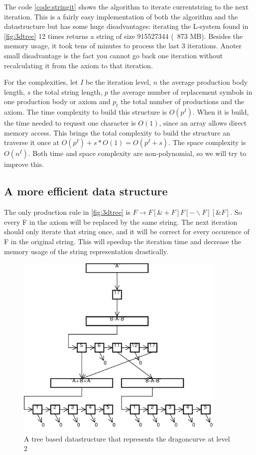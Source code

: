 \documentclass[11pt,a4paper]{article}
\begin{document}
The code \ref{code:stringit} shows the algorithm to iterate currentstring to the next iteration. This is a fairly easy implementation of both the algorithm and the datastructure but has some huge disadvantages: iterating the L-system found in \ref{fig:3dtree} 12 times returns a string of size 915527344 (~873 MB). Besides the memory usage, it took tens of minutes to process the last 3 iterations. Anoter small disadvantage is the fact you cannot go back one iteration without recalculating it from the axiom to that iteration.

For the complexities, let $I$ be the iteration level, $n$ the average production body length, $s$ the total string length, $p$ the average number of replacement symbols in one production body or axiom and $p_t$ the total number of productions and the axiom.
The time complexity to build this structure is $O(p^I)$. When it is build, the time needed to request one character is $O(1)$, since an array allows direct memory access. This brings the total complexity to build the structure an traverse it once at $O(p^I)+s*O(1) = O(p^I+s)$.
The space complexity is $O(n^I)$. Both time and space complexity are non-polynomial, so we will try to improve this.

\subsection{A more efficient data structure} %

The only production rule in \ref{fig:3dtree} is $F \rightarrow F[\&+F]F[-\backslash F][\&F]$. So every F in the axiom will be replaced by the same string. The next iteration should only iterate that string once, and it will be correct for every occurence of F in the original string. This will speedup the iteration time and decrease the memory usage of the string representation drastically.


\begin{figure}[h!]
  \centering
  \includegraphics[width=0.9\textwidth]{struct.pdf}
  \caption{A tree based datastructure that represents the dragoncurve at level 2}
  \label{fig:struct}
\end{figure}
\end{document}
